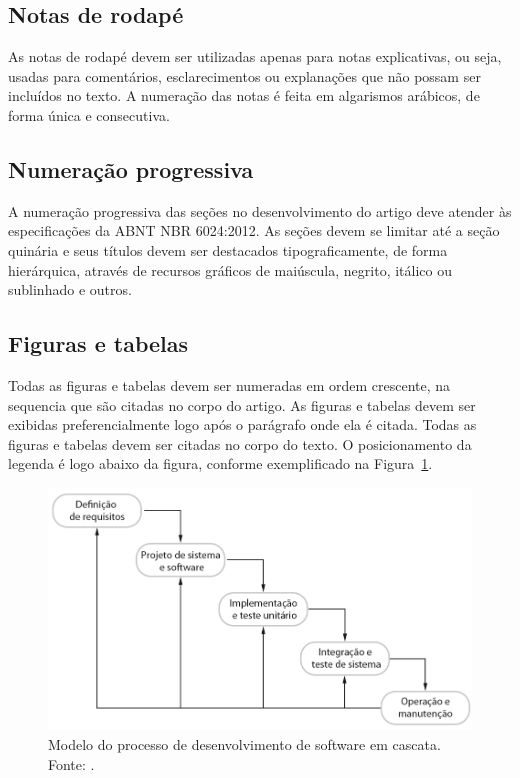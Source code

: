 \documentclass[article,a4paper,12pt,brazil,sumario=tradicional]{abntex2}
\begin{document}
\subsection{Notas de rodapé}

As notas de rodapé devem ser utilizadas apenas para notas explicativas, ou seja, usadas para comentários, esclarecimentos ou explanações que não possam ser incluídos no texto. A numeração das notas é feita em algarismos arábicos, de forma única e consecutiva.

\subsection{Numeração progressiva}

A numeração progressiva das seções no desenvolvimento do artigo deve atender às especificações da ABNT NBR 6024:2012. As seções devem se limitar até a seção quinária e seus títulos devem ser destacados tipograficamente, de forma hierárquica, através de recursos gráficos de maiúscula, negrito, itálico ou sublinhado e outros.

\subsection{Figuras e tabelas}

Todas as figuras e tabelas devem ser numeradas em ordem crescente, na sequencia que são citadas no corpo do artigo. As figuras e tabelas devem ser exibidas preferencialmente logo após o parágrafo onde ela é citada. Todas as figuras e tabelas devem ser citadas no corpo do texto. O posicionamento da legenda é logo abaixo da figura, conforme exemplificado na Figura~\ref{fig:exampleFig1}.

\begin{figure}[!ht]
\centering
\includegraphics[width=1\textwidth]{Imagem1.png}
\caption{Modelo do processo de desenvolvimento de software em cascata. Fonte: \cite{sommerville2011software}.}
\label{fig:exampleFig1}
\end{figure}
\end{document}
